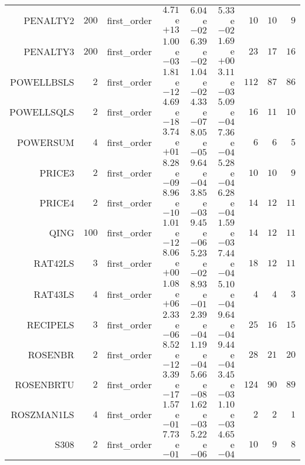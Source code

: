 \begin{longtable}{rrrrrrrrr}
PENALTY2 & \(   200\) & first\_order & \( 4.71\)e\(+13\) & \( 6.04\)e\(-02\) & \( 5.33\)e\(-02\) & \(    10\) & \(    10\) & \(     9\) \\
PENALTY3 & \(   200\) & first\_order & \( 1.00\)e\(-03\) & \( 6.39\)e\(-02\) & \( 1.69\)e\(+00\) & \(    23\) & \(    17\) & \(    16\) \\
POWELLBSLS & \(     2\) & first\_order & \( 1.81\)e\(-12\) & \( 1.04\)e\(-02\) & \( 3.11\)e\(-03\) & \(   112\) & \(    87\) & \(    86\) \\
POWELLSQLS & \(     2\) & first\_order & \( 4.69\)e\(-18\) & \( 4.33\)e\(-07\) & \( 5.09\)e\(-04\) & \(    16\) & \(    11\) & \(    10\) \\
POWERSUM & \(     4\) & first\_order & \( 3.74\)e\(+01\) & \( 8.05\)e\(-05\) & \( 7.36\)e\(-04\) & \(     6\) & \(     6\) & \(     5\) \\
PRICE3 & \(     2\) & first\_order & \( 8.28\)e\(-09\) & \( 9.64\)e\(-04\) & \( 5.28\)e\(-04\) & \(    10\) & \(    10\) & \(     9\) \\
PRICE4 & \(     2\) & first\_order & \( 8.96\)e\(-10\) & \( 3.85\)e\(-03\) & \( 6.28\)e\(-04\) & \(    14\) & \(    12\) & \(    11\) \\
QING & \(   100\) & first\_order & \( 1.01\)e\(-12\) & \( 9.45\)e\(-06\) & \( 1.59\)e\(-03\) & \(    14\) & \(    12\) & \(    11\) \\
RAT42LS & \(     3\) & first\_order & \( 8.06\)e\(+00\) & \( 5.23\)e\(-02\) & \( 7.44\)e\(-04\) & \(    18\) & \(    12\) & \(    11\) \\
RAT43LS & \(     4\) & first\_order & \( 1.08\)e\(+06\) & \( 8.93\)e\(-01\) & \( 5.10\)e\(-04\) & \(     4\) & \(     4\) & \(     3\) \\
RECIPELS & \(     3\) & first\_order & \( 2.33\)e\(-06\) & \( 2.39\)e\(-04\) & \( 9.64\)e\(-04\) & \(    25\) & \(    16\) & \(    15\) \\
ROSENBR & \(     2\) & first\_order & \( 8.52\)e\(-12\) & \( 1.19\)e\(-04\) & \( 9.44\)e\(-04\) & \(    28\) & \(    21\) & \(    20\) \\
ROSENBRTU & \(     2\) & first\_order & \( 3.39\)e\(-17\) & \( 5.66\)e\(-08\) & \( 3.45\)e\(-03\) & \(   124\) & \(    90\) & \(    89\) \\
ROSZMAN1LS & \(     4\) & first\_order & \( 1.57\)e\(-01\) & \( 1.62\)e\(-03\) & \( 1.10\)e\(-03\) & \(     2\) & \(     2\) & \(     1\) \\
S308 & \(     2\) & first\_order & \( 7.73\)e\(-01\) & \( 5.22\)e\(-06\) & \( 4.65\)e\(-04\) & \(    10\) & \(     9\) & \(     8\) \\

\end{longtable}
